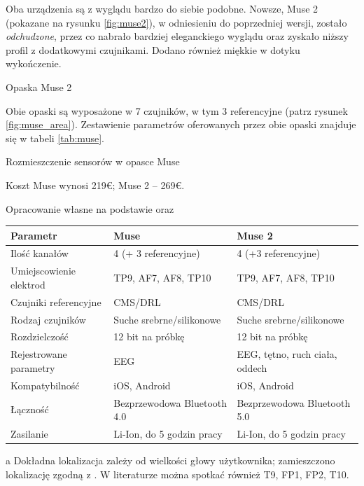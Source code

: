 \documentclass[skorowidz,skroty]{dyplomWEZUT}
\begin{document}
Oba urządzenia są z wyglądu bardzo do siebie podobne. Nowsze, Muse 2 (pokazane na rysunku \vref{fig:muse2}), w odniesieniu do poprzedniej wersji, zostało \textit{odchudzone}, przez co nabrało bardziej eleganckiego wyglądu oraz zyskało niższy profil z dodatkowymi czujnikami\cite{muse_comparison_article}. Dodano również miękkie w dotyku wykończenie.

{Opaska Muse 2\label{fig:muse2}}
{\cite{muse2}}
  
Obie opaski są wyposażone w 7 czujników, w tym 3 referencyjne (patrz rysunek \vref{fig:muse_area}). Zestawienie parametrów oferowanych przez obie opaski znajduje się w tabeli \vref{tab:muse}.

{Rozmieszczenie sensorów w opasce Muse\label{fig:muse_area}}
{\cite{muse_specification}}

Koszt Muse wynosi 219€; Muse 2 -- 269€.

{Opracowanie własne na podstawie \cite{muse_comparison} oraz \cite{muse_specification}}
{
    \begin{threeparttable}
        \begin{tabular}{l|l|l}
            Parametr & Muse & Muse 2 \\\hline\hline
            Ilość kanałów & 4 (+ 3 referencyjne) & 4 (+3 referencyjne)\\
            Umiejscowienie elektrod & TP9, AF7, AF8, TP10\tnote{a} & TP9, AF7, AF8, TP10\tnote{a} \\
            Czujniki referencyjne & CMS/DRL & CMS/DRL \\
            Rodzaj czujników & Suche srebrne/silikonowe & Suche srebrne/silikonowe \\
            Rozdzielczość & 12 bit na próbkę & 12 bit na próbkę \\
            Rejestrowane parametry & EEG & EEG, tętno, ruch ciała, oddech \\
            Kompatybilność & iOS, Android & iOS, Android \\
            Łączność & Bezprzewodowa Bluetooth 4.0 & Bezprzewodowa Bluetooth 5.0 \\
            Zasilanie & Li-Ion, do 5 godzin pracy & Li-Ion, do 5 godzin pracy \\
        \end{tabular}
        \begin{tablenotes}
            \item[a] \footnotesize Dokładna lokalizacja zależy od wielkości głowy użytkownika; zamieszczono lokalizację zgodną z \cite{muse_specification}. W literaturze można spotkać również T9, FP1, FP2, T10\cite{muse_article}.
        \end{tablenotes}
    \end{threeparttable}
}
\end{document}
